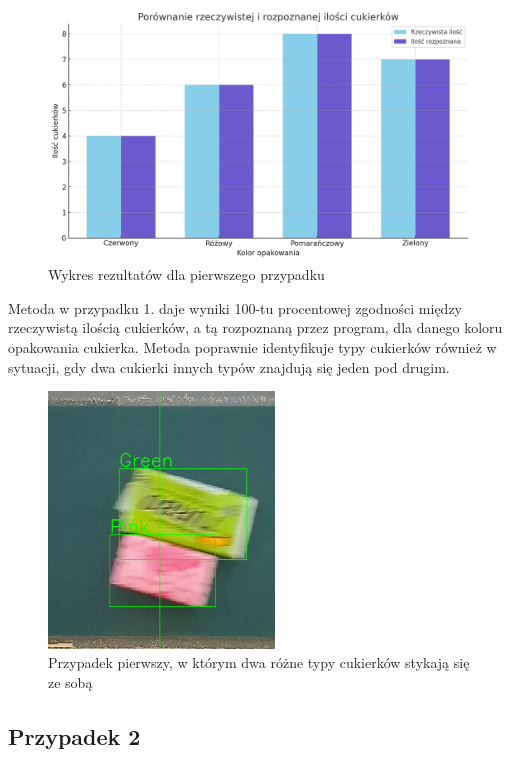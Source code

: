 \documentclass{article}
\begin{document}
\begin{figure}[H]
    \centering
    \includegraphics[width=\linewidth]{wykres1.png}
    \caption{Wykres rezultatów dla pierwszego przypadku}
    \label{fig:przypadek1}
\end{figure}


Metoda w przypadku 1. daje wyniki 100-tu procentowej zgodności między rzeczywistą ilością cukierków, a tą rozpoznaną przez program, dla danego koloru opakowania cukierka. Metoda poprawnie identyfikuje typy cukierków również w sytuacji, gdy dwa cukierki innych typów znajdują się jeden pod drugim.

\begin{figure}[H]
    \centering
    \includegraphics[width=6cm]{badanie.png}
    \caption{Przypadek pierwszy, w którym dwa różne typy cukierków stykają się ze sobą}
\end{figure}

\subsection{Przypadek 2}
\end{document}
